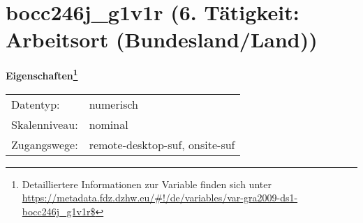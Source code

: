 
    \setcounter{footnote}{0}

    \vspace*{-1.8cm}
	\section{bocc246j\_g1v1r (6. Tätigkeit: Arbeitsort (Bundesland/Land))}
	\label{section:bocc246j_g1v1r}



    \vspace*{0.5cm}
    \noindent\textbf{Eigenschaften\footnote{Detailliertere Informationen zur Variable finden sich unter
		\url{https://metadata.fdz.dzhw.eu/\#!/de/variables/var-gra2009-ds1-bocc246j_g1v1r$}}}\\
	\begin{tabularx}{\hsize}{@{}lX}
	Datentyp: & numerisch \\
	Skalenniveau: & nominal \\
	Zugangswege: &
	  remote-desktop-suf, 
	  onsite-suf
 \\
    \end{tabularx}



